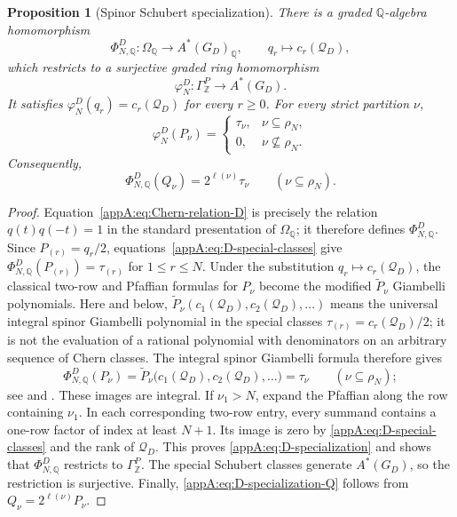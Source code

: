 \documentclass[11pt,a4paper,oneside]{amsart}
\numberwithin{equation}{section}
\newtheorem{proposition}[theorem]{Proposition}
\theoremstyle{definition}
\theoremstyle{remark}
\begin{document}
\begin{proposition}[Spinor Schubert specialization]
\label{appA:prop:spinor-specialization}
There is a graded $\mathbb Q$-algebra homomorphism
\[
  \Phi^D_{N,\mathbb Q}:\Omega_{\mathbb Q}
  \longrightarrow A^*(G_D)_{\mathbb Q},
  \qquad
  q_r\longmapsto c_r(\mathcal Q_D),
\]
which restricts to a surjective graded ring homomorphism
\[
  \varphi_N^D:\Gamma^P_{\mathbb Z}\longrightarrow A^*(G_D).
\]
It satisfies $\varphi_N^D(q_r)=c_r(\mathcal Q_D)$ for every $r\geq0$.
For every strict partition $\nu$,
\begin{equation}
\label{appA:eq:D-specialization}
  \varphi_N^D(P_\nu)=
  \begin{cases}
    \tau_\nu,&\nu\subseteq\rho_N,\\
    0,&\nu\not\subseteq\rho_N.
  \end{cases}
\end{equation}
Consequently,
\begin{equation}
\label{appA:eq:D-specialization-Q}
  \Phi^D_{N,\mathbb Q}(Q_\nu)
  =2^{\ell(\nu)}\tau_\nu
  \qquad(\nu\subseteq\rho_N).
\end{equation}
\end{proposition}

\begin{proof}
Equation~\eqref{appA:eq:Chern-relation-D} is precisely the relation
$q(t)q(-t)=1$ in the standard presentation of $\Omega_{\mathbb Q}$; it
therefore defines $\Phi^D_{N,\mathbb Q}$.  Since
$P_{(r)}=q_r/2$, equations~\eqref{appA:eq:D-special-classes} give
$\Phi^D_{N,\mathbb Q}(P_{(r)})=\tau_{(r)}$ for $1\le r\le N$.
Under the substitution $q_r\mapsto c_r(\mathcal Q_D)$, the classical
two-row and Pfaffian formulas for $P_\nu$ become the modified
$\widetilde P_\nu$ Giambelli polynomials.  Here and below,
$\widetilde P_\nu(c_1(\mathcal Q_D),c_2(\mathcal Q_D),\ldots)$ means the
universal integral spinor Giambelli polynomial in the special classes
$\tau_{(r)}=c_r(\mathcal Q_D)/2$; it is not the evaluation of a rational
polynomial with denominators on an arbitrary sequence of Chern classes.
The integral spinor Giambelli formula therefore gives
\[
  \Phi^D_{N,\mathbb Q}(P_\nu)
  =\widetilde P_\nu\bigl(c_1(\mathcal Q_D),c_2(\mathcal Q_D),\ldots\bigr)
  =\tau_\nu
  \qquad(\nu\subseteq\rho_N);
\]
see \cite{PR97} and \cite[\S3.1]{KT04}.  These images are integral.  If
$\nu_1>N$, expand the Pfaffian along the row containing $\nu_1$.  In each
corresponding two-row entry, every summand contains a one-row factor of index
at least $N+1$.  Its image is zero by
\eqref{appA:eq:D-special-classes} and the rank of $\mathcal Q_D$.  This proves
\eqref{appA:eq:D-specialization} and shows that
$\Phi^D_{N,\mathbb Q}$ restricts to $\Gamma^P_{\mathbb Z}$.  The special
Schubert classes generate $A^*(G_D)$, so the restriction is surjective.
Finally, \eqref{appA:eq:D-specialization-Q} follows from
$Q_\nu=2^{\ell(\nu)}P_\nu$.
\end{proof}
\end{document}
